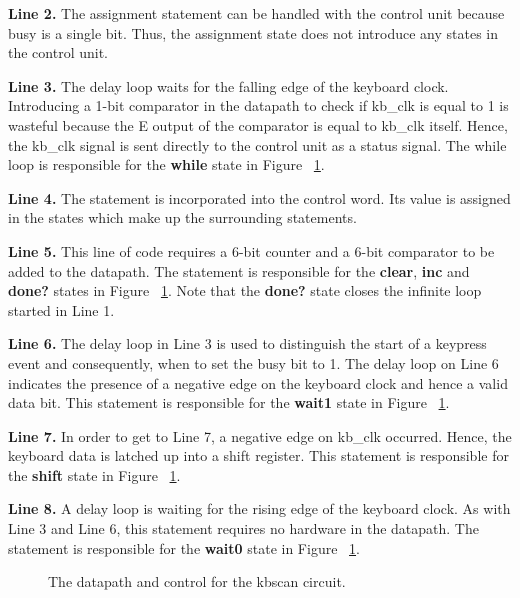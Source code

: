 {\bf Line 2.} The assignment statement can be handled with the control unit
because busy is a single bit.  Thus, the assignment state does not introduce
any states in the control unit.

{\bf Line 3.} The delay loop waits for the falling edge of the keyboard clock.
Introducing a 1-bit comparator in the datapath to check if kb\_clk is equal
to 1 is wasteful because the E output of the comparator is equal to kb\_clk
itself.  Hence, the kb\_clk signal is sent directly to the control unit as
a status signal.  The while loop is responsible for the {\bf while} state 
in Figure ~\ref{fig:kbscan}.

{\bf Line 4.} The statement is incorporated into the control word.  Its
value is assigned in the states which make up the surrounding statements.

{\bf Line 5.} This line of code requires  a 6-bit counter and a 6-bit 
comparator to be added to the datapath.  The statement is responsible 
for the {\bf clear}, {\bf inc} and {\bf done?} states in 
Figure ~\ref{fig:kbscan}.  Note that the {\bf done?} state closes the 
infinite loop started in Line 1.

{\bf Line 6.} The delay loop in Line 3 is used to distinguish the start of a 
keypress event and consequently, when to set the busy bit to 1.  The 
delay loop on Line 6 indicates the presence of a negative edge on the 
keyboard clock and hence a valid data bit.  This statement is responsible 
for the {\bf wait1} state in Figure ~\ref{fig:kbscan}.

{\bf Line 7.} In order to get to Line 7, a negative edge on kb\_clk occurred.
Hence, the keyboard data is latched up into a shift register.  This 
statement is responsible for the {\bf shift} state in Figure ~\ref{fig:kbscan}.

{\bf Line 8.} A delay loop is waiting for the rising edge of the keyboard clock.  
As with Line 3 and Line 6, this statement requires no hardware in the datapath.  
The statement is responsible for the {\bf wait0} state in Figure ~\ref{fig:kbscan}.

\begin{figure}[ht]
\caption{The datapath and control for the kbscan circuit.}
\label{fig:kbscan}
\end{figure}

